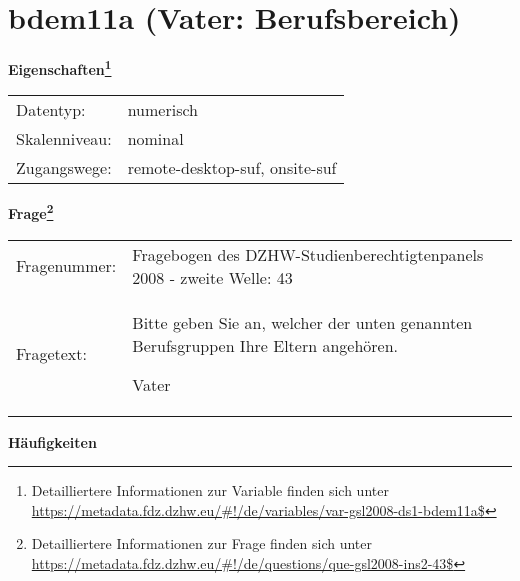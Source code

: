 
    \setcounter{footnote}{0}

    \vspace*{-1.8cm}
	\section{bdem11a (Vater: Berufsbereich)}
	\label{section:bdem11a}



    \vspace*{0.5cm}
    \noindent\textbf{Eigenschaften\footnote{Detailliertere Informationen zur Variable finden sich unter
		\url{https://metadata.fdz.dzhw.eu/\#!/de/variables/var-gsl2008-ds1-bdem11a$}}}\\
	\begin{tabularx}{\hsize}{@{}lX}
	Datentyp: & numerisch \\
	Skalenniveau: & nominal \\
	Zugangswege: &
	  remote-desktop-suf, 
	  onsite-suf
 \\
    \end{tabularx}



				\vspace*{0.5cm}
                \noindent\textbf{Frage\footnote{Detailliertere Informationen zur Frage finden sich unter
		              \url{https://metadata.fdz.dzhw.eu/\#!/de/questions/que-gsl2008-ins2-43$}}}\\
				\begin{tabularx}{\hsize}{@{}lX}
					Fragenummer: &
					  Fragebogen des DZHW-Studienberechtigtenpanels 2008 - zweite Welle:
					  43
 \\
					Fragetext: & Bitte geben Sie an, welcher der unten genannten Berufsgruppen Ihre Eltern angehören.\par  Vater \\
				\end{tabularx}





        		\vspace*{0.5cm}
                \noindent\textbf{Häufigkeiten}

